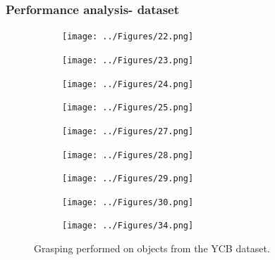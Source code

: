 \documentclass{beamer}
\theoremstyle{remark}
\theoremstyle{plain}
\begin{document}
\begin{frame}
	\frametitle{Performance analysis- dataset}
	
	\begin{figure}[!t]
		\begin{subfigure}[t]{0.13\textwidth}
			\texttt{[image: ../Figures/22.png]}
			\caption{}
			\label{fig:powerdrill}
		\end{subfigure}
		\begin{subfigure}[t]{0.13\textwidth}
			\texttt{[image: ../Figures/23.png]}
			\caption{}
			\label{fig:scissors}
		\end{subfigure}
		\begin{subfigure}[t]{0.13\textwidth}
			\texttt{[image: ../Figures/24.png]}
			\caption{}
			\label{fig:largemarker}
		\end{subfigure}
		\begin{subfigure}[t]{0.13\textwidth}
			\texttt{[image: ../Figures/25.png]}
			\caption{}
			\label{fig:adjustablewrench}
		\end{subfigure}
		\begin{subfigure}[t]{0.13\textwidth}
			\texttt{[image: ../Figures/27.png]}
			\caption{}
			\label{fig:flatscrewdriver}
		\end{subfigure}
		\begin{subfigure}[t]{0.13\textwidth}
			\texttt{[image: ../Figures/28.png]}
			\caption{}
			\label{fig:hammer}
		\end{subfigure}
		\begin{subfigure}[t]{0.13\textwidth}
			\texttt{[image: ../Figures/29.png]}
			\caption{}
			\label{fig:baseball}
		\end{subfigure}
		\begin{subfigure}[t]{0.13\textwidth}
			\texttt{[image: ../Figures/30.png]}
			\caption{}
			\label{fig:tennisball}
		\end{subfigure}
		\begin{subfigure}[t]{0.13\textwidth}
			\texttt{[image: ../Figures/34.png]}
			\caption{}
			\label{fig:toyairplane}
		\end{subfigure}
		\caption{Grasping performed on objects from the YCB dataset.}\label{fig:ycbgrasps}
	\end{figure}
	
\end{frame}
\end{document}
